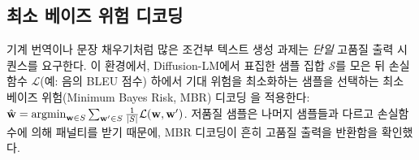 \subsection{최소 베이즈 위험 디코딩}
\label{ssec:mbr1}
기계 번역이나 문장 채우기처럼 많은 조건부 텍스트 생성 과제는 \emph{단일} 고품질 출력 시퀀스를 요구한다.
이 환경에서, Diffusion-LM에서 표집한 샘플 집합 $\mathcal{S}$를 모은 뒤 손실함수 $\mathcal{L}$(예: 음의 BLEU 점수) 하에서 기대 위험을 최소화하는 샘플을 선택하는 최소 베이즈 위험(Minimum Bayes Risk, MBR) 디코딩 \cite{kumar-byrne-2004-minimum}을 적용한다: $\hat{\mathbf{w}} = \operatorname{argmin}_{\mathbf{w} \in S} \sum_{\mathbf{w}' \in S} \frac{1}{|S|}\mathcal{L}(\mathbf{w}, \mathbf{w}')$. 저품질 샘플은 나머지 샘플들과 다르고 손실함수에 의해 패널티를 받기 때문에, MBR 디코딩이 흔히 고품질 출력을 반환함을 확인했다.





